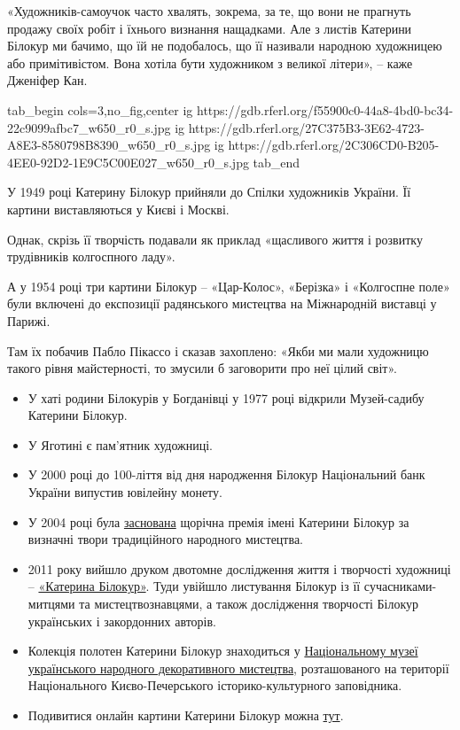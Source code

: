 «Художників-самоучок часто хвалять, зокрема, за те, що вони не прагнуть продажу
своїх робіт і їхнього визнання нащадками. Але з листів Катерини Білокур ми
бачимо, що їй не подобалось, що її називали народною художницею або
примітивістом. Вона хотіла бути художником з великої літери», – каже Дженіфер
Кан.

\ifcmt
tab_begin cols=3,no_fig,center
  ig https://gdb.rferl.org/f55900c0-44a8-4bd0-bc34-22c9099afbc7_w650_r0_s.jpg
  ig https://gdb.rferl.org/27C375B3-3E62-4723-A8E3-8580798B8390_w650_r0_s.jpg
  ig https://gdb.rferl.org/2C306CD0-B205-4EE0-92D2-1E9C5C00E027_w650_r0_s.jpg
tab_end
\fi


У 1949 році Катерину Білокур прийняли до Спілки художників України. Її картини
виставляються у Києві і Москві.

Однак, скрізь її творчість подавали як приклад «щасливого життя і розвитку
трудівників колгоспного ладу».

А у 1954 році три картини Білокур – «Цар-Колос», «Берізка» і «Колгоспне поле»
були включені до експозиції радянського мистецтва на Міжнародній виставці у
Парижі.

Там їх побачив Пабло Пікассо і сказав захоплено: «Якби ми мали художницю такого
рівня майстерності, то змусили б заговорити про неї цілий світ».


\begin{itemize} %
\item У хаті родини Білокурів у Богданівці у 1977 році відкрили Музей-садибу Катерини Білокур.
\item У Яготині є пам’ятник художниці.
\item У 2000 році до 100-ліття від дня народження Білокур Національний банк України випустив ювілейну монету.
\item У 2004 році була \href{https://zakon.rada.gov.ua/laws/show/z1485-04#Text}{заснована} щорічна премія імені Катерини Білокур за визначні твори традиційного народного мистецтва.
\item 2011 року вийшло друком двотомне дослідження життя і творчості художниці – \href{https://www.radiosvoboda.org/a/3542208.html}{«Катерина Білокур»}. Туди увійшло листування Білокур із її сучасниками-митцями та мистецтвознавцями, а також дослідження творчості Білокур українських і закордонних авторів.
\item Колекція полотен Катерини Білокур знаходиться у \href{https://www.mundm.kiev.ua/COLLECTN/BILOKUR.HTM}{Національному музеї українського народного декоративного мистецтва}, розташованого на території Національного Києво-Печерського історико-культурного заповідника.
\item Подивитися онлайн картини Катерини Білокур можна \href{https://www.wikiart.org/uk/katerina-bilokur}{тут}.
\end{itemize} %
